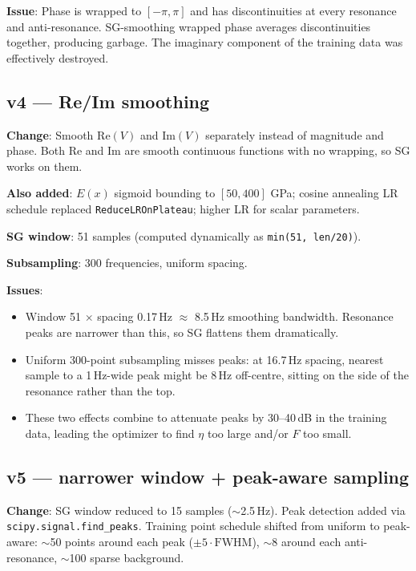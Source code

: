 \documentclass[11pt,a4paper]{article}
\begin{document}
\textbf{Issue}: Phase is wrapped to $[-\pi, \pi]$ and has discontinuities at every resonance and anti-resonance. SG-smoothing wrapped phase averages discontinuities together, producing garbage. The imaginary component of the training data was effectively destroyed.

\subsection{v4 --- Re/Im smoothing}

\textbf{Change}: Smooth $\text{Re}(V)$ and $\text{Im}(V)$ separately instead of magnitude and phase. Both Re and Im are smooth continuous functions with no wrapping, so SG works on them.

\textbf{Also added}: $E(x)$ sigmoid bounding to $[50, 400]$ GPa; cosine annealing LR schedule replaced \texttt{ReduceLROnPlateau}; higher LR for scalar parameters.

\textbf{SG window}: 51 samples (computed dynamically as \texttt{min(51, len/20)}).

\textbf{Subsampling}: 300 frequencies, uniform spacing.

\textbf{Issues}:
\begin{itemize}[leftmargin=*, itemsep=2pt]
\item Window 51 $\times$ spacing 0.17\,Hz $\approx$ 8.5\,Hz smoothing bandwidth. Resonance peaks are narrower than this, so SG flattens them dramatically.
\item Uniform 300-point subsampling misses peaks: at 16.7\,Hz spacing, nearest sample to a 1\,Hz-wide peak might be 8\,Hz off-centre, sitting on the side of the resonance rather than the top.
\item These two effects combine to attenuate peaks by 30--40\,dB in the training data, leading the optimizer to find $\eta$ too large and/or $F$ too small.
\end{itemize}

\subsection{v5 --- narrower window + peak-aware sampling}

\textbf{Change}: SG window reduced to 15 samples ($\sim$2.5\,Hz). Peak detection added via \texttt{scipy.signal.find\_peaks}. Training point schedule shifted from uniform to peak-aware: $\sim$50 points around each peak ($\pm 5 \cdot \text{FWHM}$), $\sim$8 around each anti-resonance, $\sim$100 sparse background.
\end{document}
